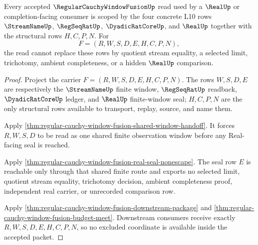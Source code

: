 \begin{theorem}
\label{thm:regular-cauchy-window-fusion-scoped-kernel-route}
Every accepted $\RegularCauchyWindowFusionUp$ read used by a $\RealUp$ or completion-facing consumer is scoped by the four concrete L10 rows $\StreamNameUp$, $\RegSeqRatUp$, $\DyadicRatCoreUp$, and $\RealUp$ together with the structural rows $H,C,P,N$. For
$$
F=(R,W,S,D,E,H,C,P,N),
$$
the read cannot replace these rows by quotient stream equality, a selected limit, trichotomy, ambient completeness, or a hidden $\RealUp$ comparison.
\end{theorem}
\begin{proof}
Project the carrier $F=(R,W,S,D,E,H,C,P,N)$. The rows $W,S,D,E$ are respectively the $\StreamNameUp$ finite window, $\RegSeqRatUp$ readback, $\DyadicRatCoreUp$ ledger, and $\RealUp$ finite-window seal; $H,C,P,N$ are the only structural rows available to transport, replay, source, and name them.

Apply \autoref{thm:regular-cauchy-window-fusion-shared-window-handoff}. It forces $R,W,S,D$ to be read as one shared finite observation window before any Real-facing seal is reached.

Apply \autoref{thm:regular-cauchy-window-fusion-real-seal-nonescape}. The seal row $E$ is reachable only through that shared finite route and exports no selected limit, quotient stream equality, trichotomy decision, ambient completeness proof, independent real carrier, or unrecorded comparison row.

Apply \autoref{thm:regular-cauchy-window-fusion-downstream-package} and \autoref{thm:regular-cauchy-window-fusion-budget-meet}. Downstream consumers receive exactly $R,W,S,D,E,H,C,P,N$, so no excluded coordinate is available inside the accepted packet.
\end{proof}

